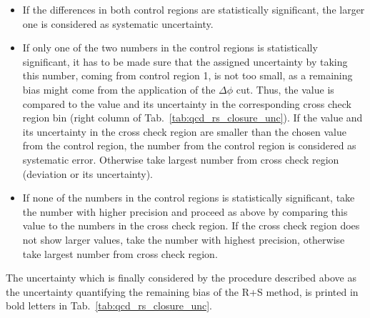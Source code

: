 \begin{itemize}
 \item If the differences in both control regions are statistically significant, the larger one is considered as systematic uncertainty. 
 \item If only one of the two numbers in the control regions is statistically significant, it has to be made sure that the assigned uncertainty by taking this number, \eg coming from control region 1, is not too small, as a remaining bias might come from the application of the $\Delta \phi$ cut. Thus, the value is compared to the value and its uncertainty in the corresponding cross check region bin (right column of Tab.~\ref{tab:qcd_rs_closure_unc}). If the value and its uncertainty in the cross check region are smaller than the chosen value from the control region, the number from the control region is considered as systematic error. Otherwise take largest number from cross check region (deviation or its uncertainty).
 \item If none of the numbers in the control regions is statistically significant, take the number with higher precision and proceed as above by comparing this value to the numbers in the cross check region. If the cross check region does not show larger values, take the number with highest precision, otherwise take largest number from cross check region.
\end{itemize}
The uncertainty which is finally considered by the procedure described above as the uncertainty quantifying the remaining bias of the R+S method, is printed in bold letters in Tab.~\ref{tab:qcd_rs_closure_unc}.

